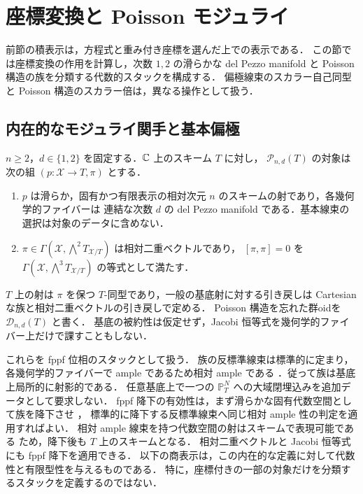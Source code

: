 \section{座標変換と Poisson モジュライ}
\label{sec:moduli}

前節の積表示は，方程式と重み付き座標を選んだ上での表示である．
この節では座標変換の作用を計算し，次数 $1,2$ の滑らかな del Pezzo manifold と
Poisson 構造の族を分類する代数的スタックを構成する．
偏極線束のスカラー自己同型と Poisson 構造のスカラー倍は，異なる操作として扱う．

\subsection{内在的なモジュライ関手と基本偏極}

\begin{definition}
\label{def:poisson-moduli-stack}
$n\geq2$，$d\in\{1,2\}$ を固定する．$\mathbb C$ 上のスキーム $T$ に対し，
$\mathcal P_{n,d}(T)$ の対象は次の組 $(p:\mathcal X\to T,\pi)$ とする．
\begin{enumerate}
\item $p$ は滑らか，固有かつ有限表示の相対次元 $n$ のスキームの射であり，各幾何学的ファイバーは
連結な次数 $d$ の del Pezzo manifold である．基本線束の選択は対象のデータに含めない．
\item $\pi\in\Gamma(\mathcal X,\bigwedge^2T_{\mathcal X/T})$ は相対二重ベクトルであり，
$[\pi,\pi]=0$ を $\Gamma(\mathcal X,\bigwedge^3T_{\mathcal X/T})$ の等式として満たす．
\end{enumerate}
$T$ 上の射は $\pi$ を保つ $T$-同型であり，一般の基底射に対する引き戻しは
Cartesian な族と相対二重ベクトルの引き戻しで定める．
Poisson 構造を忘れた群oidを $\mathcal D_{n,d}(T)$ と書く．
基底の被約性は仮定せず，Jacobi 恒等式を幾何学的ファイバー上だけで課すこともしない．
\end{definition}

これらを fppf 位相のスタックとして扱う．
族の反標準線束は標準的に定まり，各幾何学的ファイバーで ample であるため相対 ample である
\cite[Tag 0D3D]{StacksProject}．従って族は基底上局所的に射影的である．
任意基底上で一つの $\mathbb P^N_T$ への大域閉埋込みを追加データとして要求しない．
fppf 降下の有効性は，まず滑らかな固有代数空間として族を降下させ
\cite[Tag 0D1G]{StacksProject}，
標準的に降下する反標準線束へ同じ相対 ample 性の判定を適用すればよい．
相対 ample 線束を持つ代数空間の射はスキームで表現可能である
\cite[Tag 0D34]{StacksProject} ため，降下後も $T$ 上のスキームとなる．
相対二重ベクトルと Jacobi 恒等式にも fppf 降下を適用できる．
以下の商表示は，この内在的な定義に対して代数性と有限型性を与えるものである．
特に，座標付きの一部の対象だけを分類するスタックを定義するのではない．

